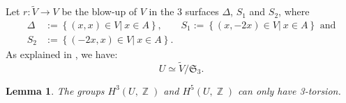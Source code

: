 \documentclass[a4paper]{article}
\newtheorem{lemme}{Lemma}
\theoremstyle{remark}
\DeclareMathOperator{\Z}{\mathbb{Z}}
\begin{document}
Let $r:\widetilde{V}\rightarrow V$ be the blow-up of $V$ in the 3 surfaces $\Delta$, $S_1$ and $S_2$, where 
\begin{align*}
\Delta&:=\left\{\left.(x,x)\in V\right|\ x\in A\right\}, 
&S_1:=\left\{\left.(x,-2x)\in V\right|\ x\in A\right\} \text{ and}\\
S_2&:=\left\{\left.(-2x,x)\in V\right|\ x\in A\right\}.
\end{align*}
As explained in \cite[Section 7]{Beauville}, 
we have: 
\begin{equation}
U\simeq \widetilde{V}/\mathfrak{S}_3.
\label{Beauvilleequa}
\end{equation}
\begin{lemme}\label{2torsion}
The groups $H^3(U,\Z)$ and $H^5(U,\Z)$ can only have 3-torsion. 
\end{lemme}
\end{document}

